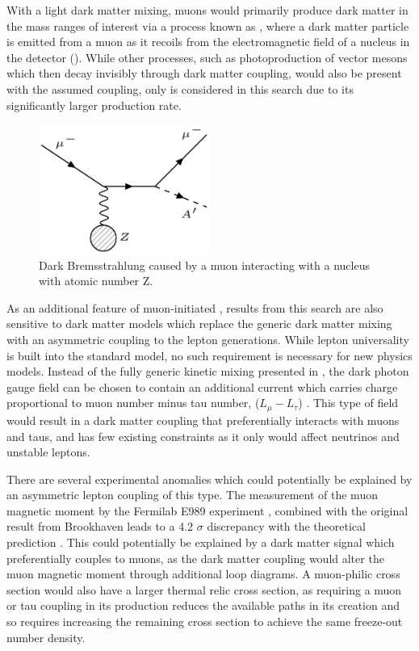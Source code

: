 With a light dark matter mixing, muons would primarily produce dark matter in the mass ranges of interest via a process known as \dbrem, where a dark matter particle is emitted from a muon as it recoils from the electromagnetic field of a nucleus in the detector ().
While other processes, such as photoproduction of vector mesons which then decay invisibly through dark matter coupling, would also be present with the assumed coupling, only \dbrem is considered in this search due to its significantly larger production rate.

\begin{figure}[ht]
	\centering
	\label{fig:dbrem_feyn}
	\includegraphics[width=0.5\textwidth]{figures/dbrem_feyn_diagram.jpg}
        \caption[Dark Bremsstrahlung Feynman Diagram]{Dark Bremsstrahlung caused by a muon interacting with a nucleus with atomic number Z.}
\end{figure}

As an additional feature of muon-initiated \dbrem, results from this search are also sensitive to dark matter models which replace the generic dark matter mixing with an asymmetric coupling to the lepton generations.
While lepton universality is built into the standard model, no such requirement is necessary for new physics models. 
Instead of the fully generic kinetic mixing presented in , the dark photon gauge field can be chosen to contain an additional current which carries charge proportional to muon number minus tau number, ($L_\mu - L_\tau$) \cite{neut_trident}.
This type of field would result in a dark matter coupling that preferentially interacts with muons and taus, and has few existing constraints as it only would affect neutrinos and unstable leptons.

There are several experimental anomalies which could potentially be explained by an asymmetric lepton coupling of this type.
The measurement of the muon magnetic moment by the Fermilab E989 experiment \cite{gminus2}, combined with the original result from Brookhaven \cite{gminus2_bnl} leads to a 4.2 $\sigma$ discrepancy with the theoretical prediction \cite{gminus2_theory}. 
This could potentially be explained by a dark matter signal which preferentially couples to muons, as the dark matter coupling would alter the muon magnetic moment through additional loop diagrams.
A muon-philic cross section would also have a larger thermal relic cross section, as requiring a muon or tau coupling in its production reduces the available paths in its creation and so requires increasing the remaining cross section to achieve the same freeze-out number density.

